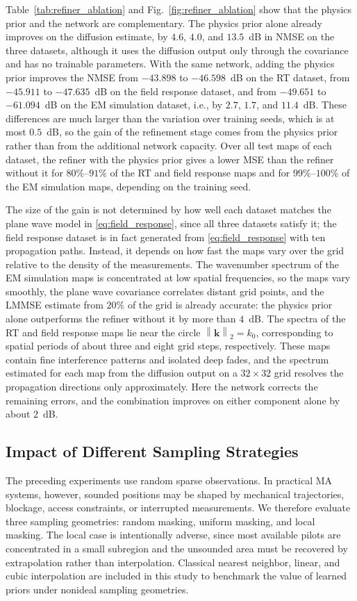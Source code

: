 \documentclass[lettersize,journal]{IEEEtran}
\newcommand{\vect}[1]{\boldsymbol{#1}}
\newcommand{\norm}[1]{\left\lVert #1 \right\rVert}
\begin{document}
Table~\ref{tab:refiner_ablation} and Fig.~\ref{fig:refiner_ablation} show that the physics prior and the network are complementary. The physics prior alone already improves on the diffusion estimate, by $4.6$, $4.0$, and $13.5$~dB in NMSE on the three datasets, although it uses the diffusion output only through the covariance and has no trainable parameters. With the same network, adding the physics prior improves the NMSE from $-43.898$ to $-46.598$~dB on the RT dataset, from $-45.911$ to $-47.635$~dB on the field response dataset, and from $-49.651$ to $-61.094$~dB on the EM simulation dataset, i.e., by $2.7$, $1.7$, and $11.4$~dB. These differences are much larger than the variation over training seeds, which is at most $0.5$~dB, so the gain of the refinement stage comes from the physics prior rather than from the additional network capacity. Over all test maps of each dataset, the refiner with the physics prior gives a lower MSE than the refiner without it for $80\%$--$91\%$ of the RT and field response maps and for $99\%$--$100\%$ of the EM simulation maps, depending on the training seed.

The size of the gain is not determined by how well each dataset matches the plane wave model in \eqref{eq:field_response}, since all three datasets satisfy it; the field response dataset is in fact generated from \eqref{eq:field_response} with ten propagation paths. Instead, it depends on how fast the maps vary over the grid relative to the density of the measurements. The wavenumber spectrum of the EM simulation maps is concentrated at low spatial frequencies, so the maps vary smoothly, the plane wave covariance correlates distant grid points, and the LMMSE estimate from $20\%$ of the grid is already accurate: the physics prior alone outperforms the refiner without it by more than $4$~dB. The spectra of the RT and field response maps lie near the circle $\norm{\vect{k}}_2=k_0$, corresponding to spatial periods of about three and eight grid steps, respectively. These maps contain fine interference patterns and isolated deep fades, and the spectrum estimated for each map from the diffusion output on a $32\times32$ grid resolves the propagation directions only approximately. Here the network corrects the remaining errors, and the combination improves on either component alone by about $2$~dB.

\subsection{Impact of Different Sampling Strategies}
The preceding experiments use random sparse observations. In practical MA systems, however, sounded positions may be shaped by mechanical trajectories, blockage, access constraints, or interrupted measurements. We therefore evaluate three sampling geometries: random masking, uniform masking, and local masking. The local case is intentionally adverse, since most available pilots are concentrated in a small subregion and the unsounded area must be recovered by extrapolation rather than interpolation. Classical nearest neighbor, linear, and cubic interpolation are included in this study to benchmark the value of learned priors under nonideal sampling geometries.
\end{document}
